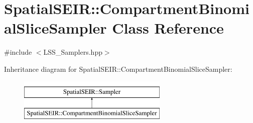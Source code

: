 \hypertarget{classSpatialSEIR_1_1CompartmentBinomialSliceSampler}{\section{Spatial\-S\-E\-I\-R\-:\-:Compartment\-Binomial\-Slice\-Sampler Class Reference}
\label{classSpatialSEIR_1_1CompartmentBinomialSliceSampler}
}


{\ttfamily \#include $<$L\-S\-S\-\_\-\-Samplers.\-hpp$>$}

Inheritance diagram for Spatial\-S\-E\-I\-R\-:\-:Compartment\-Binomial\-Slice\-Sampler\-:\begin{figure}[H]
\begin{center}
\leavevmode
\includegraphics[height=2.000000cm]{classSpatialSEIR_1_1CompartmentBinomialSliceSampler}
\end{center}
\end{figure}
